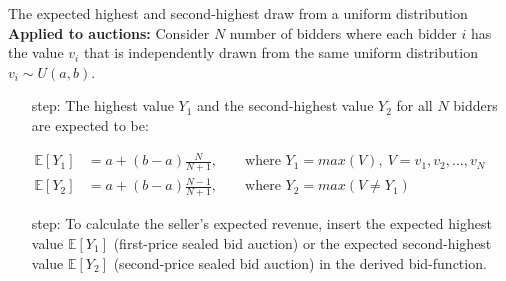 \begin{frame}{The expected highest and second-highest draw from a uniform distribution}
    \textbf{Applied to auctions:} Consider $N$ number of bidders where each bidder $i$ has the value $v_i$ that is independently drawn from the same uniform distribution $v_i\sim U(a,b)$.
    \begin{itemize}
      \item[\nth{1} step:] The highest value $Y_1$ and the second-highest value $Y_2$ for all $N$ bidders are expected to be:
    \end{itemize}
    \begin{align*}
      \mathbb{E}[Y_1]&=a+(b-a)\frac{N}{N+1},&&\text{ where }Y_1=max(V),\ V=v_1,v_2,...,v_N\\
      \mathbb{E}[Y_2]&=a+(b-a)\frac{N-1}{N+1},&&\text{ where }Y_2=max(V\neq Y_1)
    \end{align*}
    \begin{itemize}
      \item[\nth{2} step:] To calculate the seller's expected revenue, insert the expected highest value $\mathbb{E}[Y_1]$ (first-price sealed bid auction) or the expected second-highest value $\mathbb{E}[Y_2]$ (second-price sealed bid auction) in the derived bid-function.
    \end{itemize}
    \vfill\null
\end{frame}

